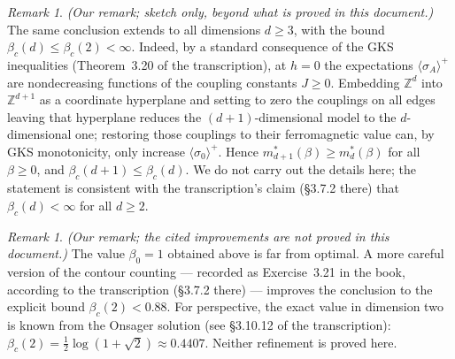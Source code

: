 \documentclass[11pt]{article}
\theoremstyle{plain}
\theoremstyle{definition}
\theoremstyle{remark}
\newtheorem{remark}[theorem]{Remark}
\newcommand{\Z}{\mathbb{Z}}
\newcommand{\sg}{\sigma}
\newcommand{\meanp}[1]{\langle #1 \rangle^{+}}
\begin{document}
\begin{remark}
\label{rem:d3}
\emph{(Our remark; sketch only, beyond what is proved in this document.)}
The same conclusion extends to all dimensions $d\ge3$, with the bound
$\beta_c(d)\le\beta_c(2)<\infty$. Indeed, by a standard consequence of the
GKS inequalities (Theorem~3.20 of the transcription), at $h=0$ the expectations
$\meanp{\sg_A}$ are nondecreasing functions of the coupling constants
$J\ge0$. Embedding $\Z^d$ into $\Z^{d+1}$ as a coordinate hyperplane and
setting to zero the couplings on all edges leaving that hyperplane reduces
the $(d+1)$-dimensional model to the $d$-dimensional one; restoring those
couplings to their ferromagnetic value can, by GKS monotonicity, only
increase $\meanp{\sg_0}$. Hence $m^*_{d+1}(\beta)\ge m^*_{d}(\beta)$ for all
$\beta\ge0$, and $\beta_c(d+1)\le\beta_c(d)$. We do not carry out the details
here; the statement is consistent with the transcription's claim
(\S3.7.2 there) that $\beta_c(d)<\infty$ for all $d\ge2$.
\end{remark}

\begin{remark}
\label{rem:explicit}
\emph{(Our remark; the cited improvements are not proved in this document.)}
The value $\beta_0=1$ obtained above is far from optimal. A more careful
version of the contour counting --- recorded as Exercise~3.21 in the book,
according to the transcription (\S3.7.2 there) --- improves the conclusion to
the explicit bound $\beta_c(2)<0.88$. For perspective, the exact value in
dimension two is known from the Onsager solution
(see \S3.10.12 of the transcription):
$\beta_c(2)=\tfrac12\log(1+\sqrt2)\approx0.4407$. Neither refinement is
proved here.
\end{remark}
\end{document}
